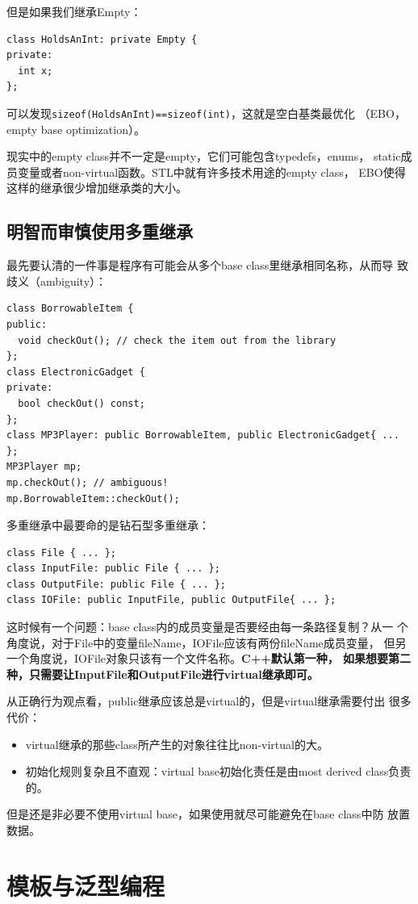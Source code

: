 但是如果我们继承Empty：
\begin{verbatim}
class HoldsAnInt: private Empty {
private:
  int x;
};
\end{verbatim}
可以发现\texttt{sizeof(HoldsAnInt)==sizeof(int)}，这就是空白基类最优化
（EBO，empty base optimization）。

现实中的empty class并不一定是empty，它们可能包含typedefs，enums，
static成员变量或者non-virtual函数。STL中就有许多技术用途的empty class，
EBO使得这样的继承很少增加继承类的大小。

\subsection{明智而审慎使用多重继承}
\label{sec:Item-40}

最先要认清的一件事是程序有可能会从多个base class里继承相同名称，从而导
致歧义（ambiguity）：
\begin{verbatim}
class BorrowableItem { 
public:
  void checkOut(); // check the item out from the library
};
class ElectronicGadget {
private:
  bool checkOut() const;
};
class MP3Player: public BorrowableItem, public ElectronicGadget{ ... }; 
MP3Player mp;
mp.checkOut(); // ambiguous!
mp.BorrowableItem::checkOut();
\end{verbatim}

多重继承中最要命的是钻石型多重继承：
\begin{verbatim}
class File { ... };
class InputFile: public File { ... };
class OutputFile: public File { ... };
class IOFile: public InputFile, public OutputFile{ ... };
\end{verbatim}
这时候有一个问题：base class内的成员变量是否要经由每一条路径复制？从一
个角度说，对于File中的变量fileName，IOFile应该有两份fileName成员变量，
但另一个角度说，IOFile对象只该有一个文件名称。\textbf{C++默认第一种，
  如果想要第二种，只需要让InputFile和OutputFile进行virtual继承即可。}

从正确行为观点看，public继承应该总是virtual的，但是virtual继承需要付出
很多代价：
\begin{itemize}
\item virtual继承的那些class所产生的对象往往比non-virtual的大。
\item 初始化规则复杂且不直观：virtual base初始化责任是由most derived
  class负责的。
\end{itemize}
但是还是非必要不使用virtual base，如果使用就尽可能避免在base class中防
放置数据。

\clearpage
\section{模板与泛型编程}

